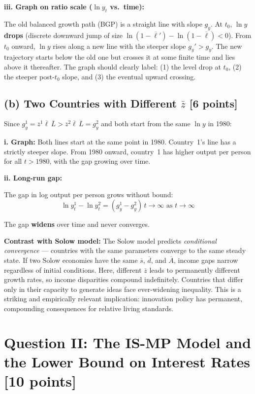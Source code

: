 \documentclass[letterpaper,12pt]{article}
\begin{document}
\noindent\textbf{iii. Graph on ratio scale ($\ln y_t$ vs.\ time):}

The old balanced growth path (BGP) is a straight line with slope $g_y$. At $t_0$, $\ln y$ \textbf{drops} (discrete downward jump of size $\ln(1-\overline{\ell}') - \ln(1-\overline{\ell}) < 0$). From $t_0$ onward, $\ln y$ rises along a new line with the steeper slope $g_y' > g_y$. The new trajectory starts below the old one but crosses it at some finite time and lies above it thereafter. The graph should clearly label: (1) the level drop at $t_0$, (2) the steeper post-$t_0$ slope, and (3) the eventual upward crossing.

\subsection*{(b) Two Countries with Different $\bar{z}$ [6 points]}

Since $g_y^1 = \overline{z}^1\overline{\ell}\,\overline{L} > \overline{z}^2\overline{\ell}\,\overline{L} = g_y^2$ and both start from the same $\ln y$ in 1980:

\noindent\textbf{i. Graph:} Both lines start at the same point in 1980. Country~1's line has a strictly steeper slope. From 1980 onward, country~1 has higher output per person for all $t > 1980$, with the gap growing over time.

\noindent\textbf{ii. Long-run gap:}

\textcolor{sol}{The gap in log output per person grows without bound:}
\[
\ln y_t^1 - \ln y_t^2 = (g_y^1 - g_y^2)\,t \to \infty \text{ as } t \to \infty
\]

The gap \textbf{widens} over time and never converges.

\textbf{Contrast with Solow model:} The Solow model predicts \emph{conditional convergence} — countries with the same parameters converge to the same steady state. If two Solow economies have the same $\overline{s}$, $\overline{d}$, and $\overline{A}$, income gaps narrow regardless of initial conditions. Here, different $\overline{z}$ leads to permanently different growth rates, so income disparities compound indefinitely. Countries that differ only in their capacity to generate ideas face ever-widening inequality. This is a striking and empirically relevant implication: innovation policy has permanent, compounding consequences for relative living standards.


\section*{Question II: The IS-MP Model and the Lower Bound on Interest Rates [10 points]}
\end{document}
